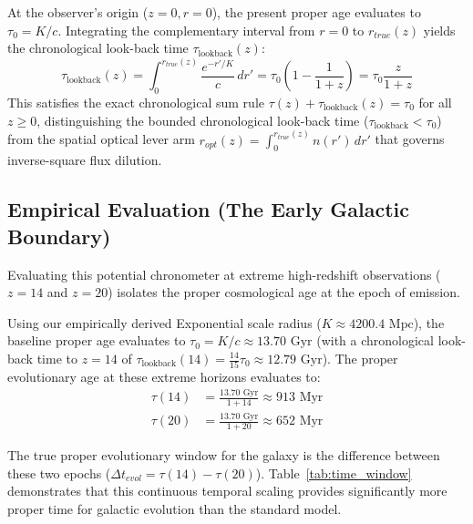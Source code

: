 \documentclass[11pt]{article}
\begin{document}
At the observer's origin ($z = 0, r = 0$), the present proper age evaluates to $\tau_0 = K/c$. Integrating the complementary interval from $r = 0$ to $r_{true}(z)$ yields the chronological look-back time $\tau_{\text{lookback}}(z)$:
\begin{equation}
    \tau_{\text{lookback}}(z) = \int_0^{r_{true}(z)} \frac{e^{-r'/K}}{c}\,dr' = \tau_0\left(1 - \frac{1}{1+z}\right) = \tau_0\frac{z}{1+z}
\end{equation}
This satisfies the exact chronological sum rule $\tau(z) + \tau_{\text{lookback}}(z) = \tau_0$ for all $z \ge 0$, distinguishing the bounded chronological look-back time ($\tau_{\text{lookback}} < \tau_0$) from the spatial optical lever arm $r_{opt}(z) = \int_0^{r_{true}(z)} n(r')\,dr'$ that governs inverse-square flux dilution.

\subsection{Empirical Evaluation (The Early Galactic Boundary)}

Evaluating this potential chronometer at extreme high-redshift observations ($z = 14$ and $z = 20$) isolates the proper cosmological age at the epoch of emission. 

Using our empirically derived Exponential scale radius ($K \approx 4200.4 \text{ Mpc}$), the baseline proper age evaluates to $\tau_0 = K/c \approx 13.70 \text{ Gyr}$ (with a chronological look-back time to $z=14$ of $\tau_{\text{lookback}}(14) = \frac{14}{15}\tau_0 \approx 12.79 \text{ Gyr}$). The proper evolutionary age at these extreme horizons evaluates to:
\begin{align}
    \tau(14) &= \frac{13.70 \text{ Gyr}}{1 + 14} \approx 913 \text{ Myr} \\
    \tau(20) &= \frac{13.70 \text{ Gyr}}{1 + 20} \approx 652 \text{ Myr}
\end{align}

The true proper evolutionary window for the galaxy is the difference between these two epochs ($\Delta t_{evol} = \tau(14) - \tau(20)$). Table~\ref{tab:time_window} demonstrates that this continuous temporal scaling provides significantly more proper time for galactic evolution than the standard model.
\end{document}
